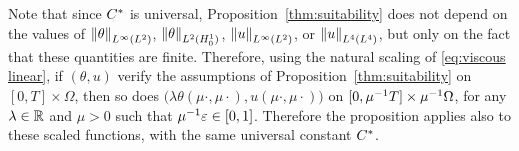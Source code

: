 \begin{remark}
Note that since $C^\ast$ is universal, Proposition~\ref{thm:suitability} does not depend on the values of $\left\lVert\theta\right\rVert_{L^\infty(L^2)}$, $\left\lVert\theta\right\rVert_{L^2(H_0^1)}$, $\left\lVert u\right\rVert_{L^\infty(L^2)}$, or $\left\lVert u\right\rVert_{L^4(L^4)}$, but only on the fact that these quantities are finite.  Therefore, using the natural scaling of \eqref{eq:viscous linear}, if $(\theta, u)$ verify the assumptions of Proposition~\ref{thm:suitability} on $[0,T]\times\Omega$, then so does $\big(\lambda \theta(\mu \cdot, \mu \cdot), u(\mu\cdot, \mu\cdot)\big)$ on $[0,\mu^{-1} T] \times \mu^{-1} \Omega$, for any $\lambda \in \mathbb{R}$ and $\mu > 0$ such that $\mu^{-1} \varepsilon \in [0,1]$.  Therefore the proposition applies also to these scaled functions, with the same universal constant $C^\ast$.  
\end{remark}

